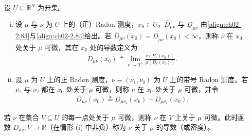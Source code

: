 \documentclass[../../main.tex]{subfiles}%
\begin{document}
\begin{definition}\label{definition:ch02-测度微分}
设 $U\subseteq\mathbb R^N$ 为开集。
\begin{enumerate}[(i)]
\item 设 $\mu$ 与 $\nu$ 为 $U$ 上的（正）Radon 测度，$x_0\in U$，$\overline{D}_{\mu\nu}$ 与 $\underline{D}_{\mu\nu}$ 由\eqref{align:ch02-2.83}与\eqref{align:ch02-2.84}给出。若 $\overline{D}_{\mu\nu}(x_0)=\underline{D}_{\mu\nu}(x_0)<\infty$，则称 $\nu$ 在 $x_0$ 处关于 $\mu$ 可微，其在 $x_0$ 处的导数定义为
\begin{align}
D_{\mu\nu}(x_0)\triangleq\lim_{r\to0^+}\frac{\nu(B_r(x_0))}{\mu(B_r(x_0))}. \label{align:ch02-2.85}
\end{align}
\item 设 $\mu$ 为 $U$ 上的正 Radon 测度，$\nu\equiv(\nu_1,\nu_2)$ 为 $U$ 上的带号 Radon 测度。若 $\nu_1$ 与 $\nu_2$ 都在 $x_0$ 处关于 $\mu$ 可微，则称 $\nu$ 在 $x_0$ 处关于 $\mu$ 可微，并令
\begin{align}
D_{\mu\nu}(x_0)\triangleq D_{\mu\nu_1}(x_0)-D_{\mu\nu_2}(x_0). \label{align:ch02-2.86}
\end{align}
\end{enumerate}
若 $\nu$ 在集合 $V\subseteq U$ 的每一点处关于 $\mu$ 可微，则称 $\nu$ 在 $V$ 上关于 $\mu$ 可微。此时函数 $D_{\mu\nu}:V\to\mathbb R$（在情形 (i) 中非负）称为 $\nu$ 关于 $\mu$ 的导数（或密度）。
\end{definition}
\end{document}
